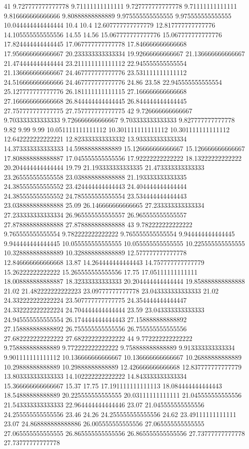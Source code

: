41 9.727777777777778 9.71111111111111 9.727777777777778 9.71111111111111 9.816666666666666 9.80888888888889 9.975555555555555 9.975555555555555 10.044444444444444 10.4 10.4 12.607777777777779 12.817777777777776 14.105555555555556 14.55 14.56 15.067777777777776 15.067777777777776 17.824444444444445 17.067777777777778 17.846666666666668 17.956666666666667 20.233333333333334 19.92666666666667 21.136666666666667 21.474444444444444 23.211111111111112 22.945555555555554 21.136666666666667 24.467777777777776 23.531111111111112 24.516666666666666 24.467777777777776 24.86 23.58 22.945555555555554 25.127777777777776 26.181111111111115 27.166666666666668 27.166666666666668 26.844444444444445 26.844444444444445 27.757777777777775 27.757777777777775
42 9.726666666666667 9.703333333333333 9.726666666666667 9.703333333333333 9.827777777777778 9.82 9.99 9.99 10.051111111111112 10.301111111111112 10.301111111111112 12.642222222222221 12.823333333333332 13.933333333333334 14.373333333333333 14.59888888888889 15.126666666666667 15.126666666666667 17.808888888888887 17.045555555555556 17.92222222222222 18.13222222222222 20.204444444444444 19.79 21.193333333333335 21.473333333333333 23.265555555555558 23.038888888888888 21.193333333333335 24.385555555555552 23.424444444444443 24.404444444444444 24.385555555555552 24.785555555555554 23.534444444444443 23.038888888888888 25.09 26.146666666666665 27.233333333333334 27.233333333333334 26.965555555555557 26.965555555555557 27.878888888888888 27.878888888888888
43 9.782222222222222 9.765555555555554 9.782222222222222 9.765555555555554 9.944444444444445 9.944444444444445 10.055555555555555 10.055555555555555 10.225555555555555 10.328888888888889 10.328888888888889 12.577777777777778 12.846666666666668 13.87 14.264444444444443 14.757777777777779 15.26222222222222 15.265555555555556 17.75 17.05111111111111 18.008888888888887 18.32333333333333 20.204444444444444 19.858888888888888 21.02 21.482222222222223 23.09777777777778 23.043333333333333 21.02 24.332222222222224 23.507777777777775 24.354444444444447 24.332222222222224 24.704444444444444 23.59 23.043333333333333 24.945555555555554 26.174444444444443 27.158888888888892 27.158888888888892 26.755555555555556 26.755555555555556 27.682222222222222 27.682222222222222
44 9.772222222222222 9.758888888888889 9.772222222222222 9.758888888888889 9.913333333333334 9.901111111111112 10.136666666666667 10.136666666666667 10.26888888888889 10.29888888888889 10.29888888888889 12.426666666666668 12.837777777777779 13.803333333333333 14.102222222222222 14.843333333333334 15.366666666666667 15.37 17.75 17.191111111111113 18.084444444444443 18.54888888888889 20.225555555555555 20.03111111111111 21.045555555555556 21.543333333333333 22.964444444444446 23.07 21.045555555555556 24.255555555555556 23.46 24.26 24.255555555555556 24.62 23.49111111111111 23.07 24.868888888888886 26.005555555555556 27.065555555555555 27.065555555555555 26.865555555555556 26.865555555555556 27.73777777777778 27.73777777777778
